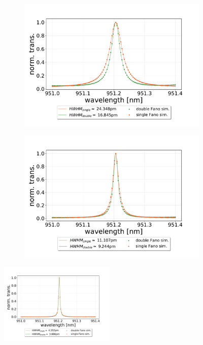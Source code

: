 \begin{figure}[h!]
\begin{subfigure}[b]{0.49\textwidth}
        \caption{}
        \label{fig:single_vs_double_simulation_30um}
    \end{subfigure}
    \begin{subfigure}[b]{0.49\textwidth}
        \includegraphics[width=\textwidth]{figures/sim_single_vs_double_90um.pdf}
        \caption{}
        \label{fig:single_vs_double_simulation_90um}
    \end{subfigure}
    \begin{subfigure}[b]{0.49\textwidth}
        \includegraphics[width=\textwidth]{figures/sim_single_vs_double_270um.pdf}
        \caption{}
        \label{fig:single_vs_double_simulation_270um}
    \end{subfigure}
    \includegraphics[width=0.49\textwidth]{figures/sim_single_vs_double_810um.pdf}
    \caption{}
    \label{fig:single_vs_double_simulation_810um}
\end{figure}

